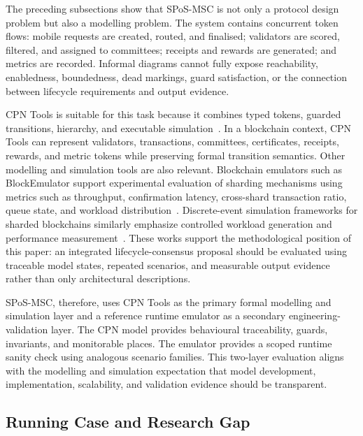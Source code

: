 \documentclass[a4paper,fleqn]{cas-sc}
\begin{document}
The preceding subsections show that SPoS-MSC is not only a protocol design problem but also a modelling problem. The system contains concurrent token flows: mobile requests are created, routed, and finalised; validators are scored, filtered, and assigned to committees; receipts and rewards are generated; and metrics are recorded. Informal diagrams cannot fully expose reachability, enabledness, boundedness, dead markings, guard satisfaction, or the connection between lifecycle requirements and output evidence.

CPN Tools is suitable for this task because it combines typed tokens, guarded transitions, hierarchy, and executable simulation~\cite{Jensen2007}. In a blockchain context, CPN Tools can represent validators, transactions, committees, certificates, receipts, rewards, and metric tokens while preserving formal transition semantics. Other modelling and simulation tools are also relevant. Blockchain emulators such as BlockEmulator support experimental evaluation of sharding mechanisms using metrics such as throughput, confirmation latency, cross-shard transaction ratio, queue state, and workload distribution~\cite{Huang2025BlockEmulator}. Discrete-event simulation frameworks for sharded blockchains similarly emphasize controlled workload generation and performance measurement~\cite{wainer2017discrete}. These works support the methodological position of this paper: an integrated lifecycle-consensus proposal should be evaluated using traceable model states, repeated scenarios, and measurable output evidence rather than only architectural descriptions.

SPoS-MSC, therefore, uses CPN Tools as the primary formal modelling and simulation layer and a reference runtime emulator as a secondary engineering-validation layer. The CPN model provides behavioural traceability, guards, invariants, and monitorable places. The emulator provides a scoped runtime sanity check using analogous scenario families. This two-layer evaluation aligns with the modelling and simulation expectation that model development, implementation, scalability, and validation evidence should be transparent.

\subsection{Running Case and Research Gap}\label{subsec:running_gap}
\end{document}
